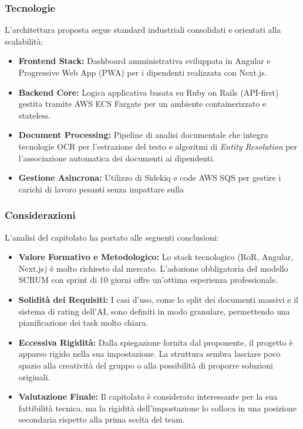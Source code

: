\documentclass[a4paper, 10pt, colorlinks=true, linkcolor=black, urlcolor=blue, citecolor=blue, hidelinks]{article}
\begin{document}
\subsubsection{Tecnologie}
L'architettura proposta segue standard industriali consolidati e orientati alla scalabilità:
\begin{itemize}
    \item \textbf{Frontend Stack:} Dashboard amministrativa sviluppata in Angular e Progressive Web App (PWA) per i dipendenti realizzata con Next.js.
    \item \textbf{Backend Core:} Logica applicativa basata su Ruby on Rails (API-first) gestita tramite AWS ECS Fargate per un ambiente containerizzato e stateless.
    \item \textbf{Document Processing:} Pipeline di analisi documentale che integra tecnologie OCR per l'estrazione del testo e algoritmi di \textit{Entity Resolution} per l'associazione automatica dei documenti ai dipendenti.
    \item \textbf{Gestione Asincrona:} Utilizzo di Sidekiq e code AWS SQS per gestire i carichi di lavoro pesanti senza impattare sulla
\end{itemize}

\subsubsection{Considerazioni}
L'analisi del capitolato ha portato alle seguenti conclusioni:
\begin{itemize}
    \item \textbf{Valore Formativo e Metodologico:} Lo stack tecnologico (RoR, Angular, Next.js) è molto richiesto dal mercato. L'adozione obbligatoria del modello SCRUM con sprint di 10 giorni offre un'ottima esperienza professionale.
    \item \textbf{Solidità dei Requisiti:} I casi d'uso, come lo split dei documenti massivi e il sistema di rating dell'AI, sono definiti in modo granulare, permettendo una pianificazione dei task molto chiara.
    \item \textbf{Eccessiva Rigidità:} Dalla spiegazione fornita dal proponente, il progetto è apparso rigido nella sua impostazione. La struttura sembra lasciare poco spazio alla creatività del gruppo o alla possibilità di proporre soluzioni originali.
    \item \textbf{Valutazione Finale:} Il capitolato è considerato interessante per la sua fattibilità tecnica, ma la rigidità dell'impostazione lo colloca in una posizione secondaria rispetto alla prima scelta del team.
\end{itemize}
\end{document}
